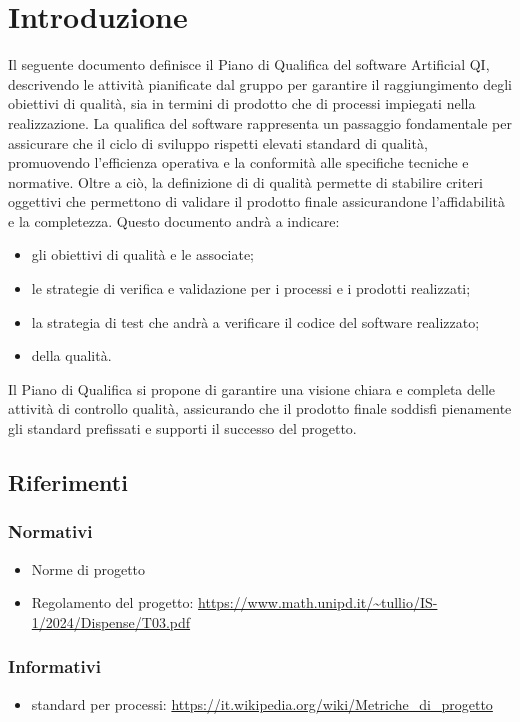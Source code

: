 \section{Introduzione}
\label{sec:introduzione_pq}
Il seguente documento definisce il Piano di Qualifica del software Artificial QI, descrivendo le attività  pianificate dal gruppo
per garantire il raggiungimento degli obiettivi di qualità, sia in termini di prodotto che di processi impiegati nella realizzazione.
La qualifica del software rappresenta un passaggio fondamentale per assicurare che il ciclo di sviluppo rispetti elevati standard di qualità, 
promuovendo l'efficienza operativa e la conformità alle specifiche tecniche e normative.
Oltre a ciò, la definizione di  di qualità permette di stabilire criteri oggettivi che permettono di validare il prodotto finale 
assicurandone l'affidabilità e la completezza.
Questo documento andrà a indicare:
\begin{itemize}
    \item gli obiettivi di qualità e le  associate;
    \item le strategie di verifica e validazione per i processi e i prodotti realizzati;
    \item la strategia di test che andrà a verificare il codice del software realizzato;
    \item {} della qualità.
\end{itemize}
Il Piano di Qualifica si propone di garantire una visione chiara e completa delle attività di controllo qualità, 
assicurando che il prodotto finale soddisfi pienamente gli standard prefissati e supporti il successo del progetto.
\subsection{Riferimenti}
\subsubsection{Normativi}
\begin{itemize}
    \item Norme di progetto
    \item Regolamento del progetto: \url{https://www.math.unipd.it/~tullio/IS-1/2024/Dispense/T03.pdf}
\end{itemize}
\subsubsection{Informativi}
\begin{itemize}
    \item {} standard per processi: \url{https://it.wikipedia.org/wiki/Metriche_di_progetto}
\end{itemize}


